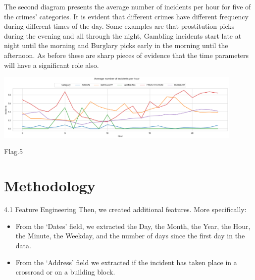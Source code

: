 The second diagram presents the average number of incidents per hour for five of the crimes' categories.
 It is evident that different crimes have different frequency during
  different times of the day. Some examples are that prostitution 
  picks during the evening and all through the night, Gambling 
  incidents start late at night until the morning and Burglary picks
   early in the morning until the afternoon. As before these are
    sharp pieces of evidence that the time parameters will have a 
    significant role also.
    \begin{center}
      \begin{minipage}{0.7\linewidth}
      \centering
    
      \includegraphics[width=0.9\textwidth]{kaggle/12.eps}
     
      {\small{Flag.5}}
    
      \end{minipage}
      \hfill
    \end{center}
\section{Methodology} \label{sec-experiment}
4.1 Feature Engineering
Then, we created additional features. More specifically:
\begin{itemize}
  \item From the ‘Dates’ field, we extracted the Day, the Month, the Year, the Hour, the Minute, the Weekday, and the number of days since the first day in the data.
  \item From the ‘Address’ field we extracted if the incident has taken place in a crossroad or on a building block.
\end{itemize}


